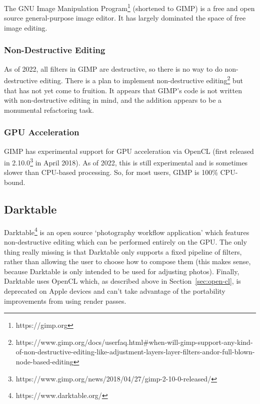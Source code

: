 \documentclass[12pt]{article}
\begin{document}
The GNU Image Manipulation Program\footnote{https://gimp.org} (shortened to GIMP) is a free and open
source general-purpose image editor.  It has largely dominated the space of free image editing.

\subsubsection{Non-Destructive Editing}

As of 2022, all filters in GIMP are destructive, so there is no way to do non-destructive editing.
There is a plan to implement non-destructive
editing\footnote{https://www.gimp.org/docs/userfaq.html\#when-will-gimp-support-any-kind-of-non-destructive-editing-like-adjustment-layers-layer-filters-andor-full-blown-node-based-editing}
but that has not yet come to fruition.  It appears that GIMP's code is not written with
non-destructive editing in mind, and the addition appears to be a monumental refactoring task.

\subsubsection{GPU Acceleration}

GIMP has experimental support for GPU acceleration via OpenCL (first released in
2.10.0\footnote{https://www.gimp.org/news/2018/04/27/gimp-2-10-0-released/} in April 2018).  As of
2022, this is still experimental and is sometimes slower than CPU-based processing.  So, for most
users, GIMP is 100\% CPU-bound.

\subsection{Darktable}

Darktable\footnote{https://www.darktable.org/} is an open source `photography workflow application'
which features non-destructive editing which can be performed entirely on the GPU.  The only thing
really missing is that Darktable only supports a fixed pipeline of filters, rather than allowing the
user to choose how to compose them (this makes sense, because Darktable is only intended to be used
for adjusting photos).  Finally, Darktable uses OpenCL which, as described above in
Section~\ref{sec:open-cl}, is deprecated on Apple devices and can't take advantage of the
portability improvements from using render passes.



\pagebreak
\end{document}
